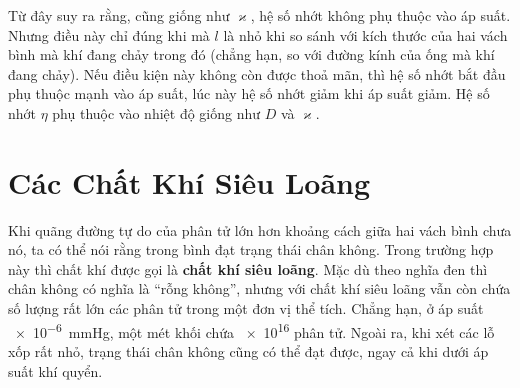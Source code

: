 \noindent
Từ đây suy ra rằng, cũng giống như $\varkappa$, hệ số nhớt không phụ thuộc vào áp suất. Nhưng điều này chỉ đúng khi mà $l$ là nhỏ khi so sánh với kích thước của hai vách bình mà khí đang chảy trong đó (chẳng hạn, so với đường kính của ống mà khí đang chảy). Nếu điều kiện này không còn được thoả mãn, thì hệ số nhớt bắt đầu phụ thuộc mạnh vào áp suất, lúc này hệ số nhớt giảm khi áp suất giảm. Hệ số nhớt $\eta$ phụ thuộc vào nhiệt độ giống như $D$ và $\varkappa$.

\section{Các Chất Khí Siêu Loãng}\label{sec:16_6}

Khi quãng đường tự do của phân tử lớn hơn khoảng cách giữa hai vách bình chưa nó, ta có thể nói rằng trong bình đạt trạng thái chân không. Trong trường hợp này thì chất khí được gọi là \textbf{chất khí siêu loãng}. Mặc dù theo nghĩa đen thì chân không có nghĩa là ``rỗng không'', nhưng với chất khí siêu loãng vẫn còn chứa số lượng rất lớn các phân tử trong một đơn vị thể tích. Chẳng hạn, ở áp suất \SI{e-6}{\mmHg}, một mét khối chứa \num{e16} phân tử. Ngoài ra, khi xét các lỗ xốp rất nhỏ, trạng thái chân không cũng có thể đạt được, ngay cả khi dưới áp suất khí quyển.


